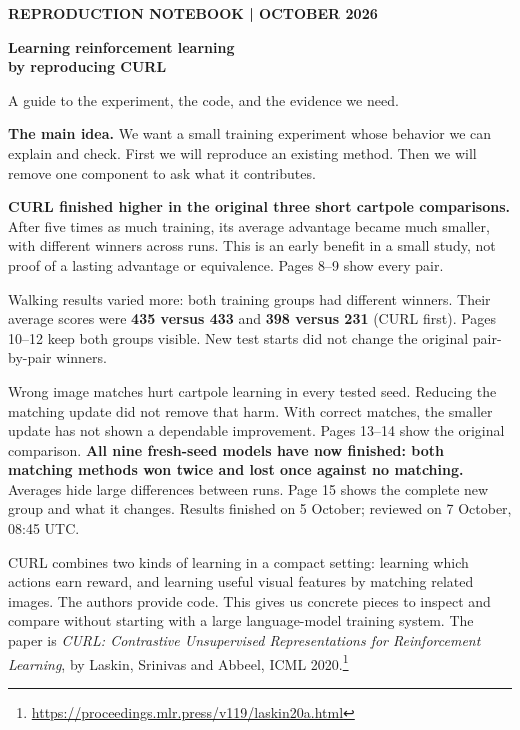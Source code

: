 \documentclass[12pt]{beamer}
\newcommand{\takeaway}[1]{\par\medskip\noindent\colorbox{wash}{\parbox{\dimexpr\linewidth-2\fboxsep\relax}{\textbf{The main idea.} #1}}\par\medskip}
\newcommand{\question}[1]{\par\smallskip{\large\color{ink}\textbf{#1}}\par}
\begin{document}
\begin{frame}[t]
\vspace*{0.55in}
{\small\color{accent}\textbf{REPRODUCTION NOTEBOOK \quad |  OCTOBER 2026}}

{\huge\color{ink}\textbf{Learning reinforcement learning\\by reproducing CURL}}

{\large A guide to the experiment, the code, and the evidence we need.}

\takeaway{We want a small training experiment whose behavior we can explain and check. First we will reproduce an existing method. Then we will remove one component to ask what it contributes.}

\question{Where are we now?}

\textbf{CURL finished higher in the original three short cartpole comparisons.}
After five times as much training, its average advantage became much smaller,
with different winners across runs. This is an early benefit in a small study,
not proof of a lasting advantage or equivalence. Pages 8--9 show every pair.

Walking results varied more: both training groups had different winners.
Their average scores were \textbf{435 versus 433} and \textbf{398 versus 231}
(CURL first). Pages 10--12 keep both groups visible. New test starts did not
change the original pair-by-pair winners.

Wrong image matches hurt cartpole learning in every tested seed. Reducing the
matching update did not remove that harm. With correct matches, the smaller
update has not shown a dependable improvement. Pages 13--14 show the original
comparison. \textbf{All nine fresh-seed models have now finished: both matching
methods won twice and lost once against no matching.} Averages hide large
differences between runs. Page 15 shows the complete new group and what it
changes. Results finished on 5 October; reviewed on 7 October, 08:45 UTC.

\question{Why this paper?}

CURL combines two kinds of learning in a compact setting: learning which actions
earn reward, and learning useful visual features by matching related images.
The authors provide code. This gives us concrete pieces to inspect and compare
without starting with a large language-model training system. The paper is
\emph{CURL: Contrastive Unsupervised Representations for Reinforcement Learning},
by Laskin, Srinivas and Abbeel, ICML 2020.\footnote{\url{https://proceedings.mlr.press/v119/laskin20a.html}}


\end{frame}
\end{document}
